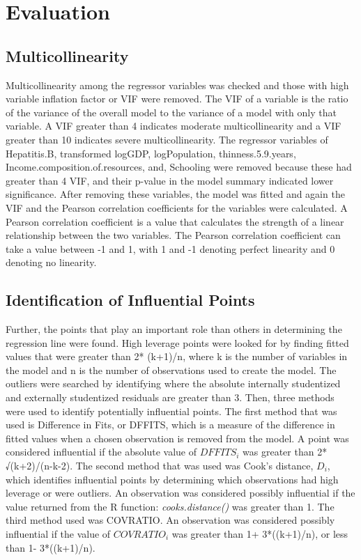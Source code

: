 \section{Evaluation}
\label{sec:evaluation}

\subsection{Multicollinearity}
\label{sec:multicollinearity}
Multicollinearity among the regressor variables was checked and those with high variable inflation factor or VIF were removed. The VIF of a variable is the ratio of the variance of the overall model to the variance of a model with only that variable. A VIF greater than 4 indicates moderate multicollinearity and a VIF greater than 10 indicates severe multicollinearity. The regressor variables of Hepatitis.B, transformed logGDP, logPopulation, thinness.5.9.years, Income.composition.of.resources, and, Schooling were removed because these had greater than 4 VIF, and their p-value in the model summary indicated lower significance. 
After removing these variables, the model was fitted and again the VIF and the Pearson correlation coefficients for the variables were calculated. A Pearson correlation coefficient is a value that calculates the strength of a linear relationship between the two variables. The Pearson correlation coefficient can take a value between -1 and 1, with 1 and -1 denoting perfect linearity and 0 denoting no linearity.

\subsection{Identification of Influential Points}
\label{sec:influential-points}
Further, the points that play an important role than others in determining the regression line were found. High leverage points were looked for by finding fitted values that were greater than 2* (k+1)/n, where k is the number of variables in the model and n is the number of observations used to create the model. The outliers were searched by identifying where the absolute internally studentized and externally studentized residuals are greater than 3. Then, three methods were used to identify potentially influential points. The first method that was used is Difference in Fits, or DFFITS, which is a measure of the difference in fitted values when a chosen observation is removed from the model. A point was considered influential if the absolute value of $DFFITS_i$ was greater than 2* √(k+2)/(n-k-2). The second method that was used was Cook’s distance, $D_i$, which identifies influential points by determining which observations had high leverage or were outliers. An observation was considered possibly influential if the value returned from the R function: \textit{cooks.distance()} was greater than 1. The third method used was COVRATIO. An observation was considered possibly influential if the value of $COVRATIO_i$ was greater than 1+ 3*((k+1)/n), or less than 1- 3*((k+1)/n).

